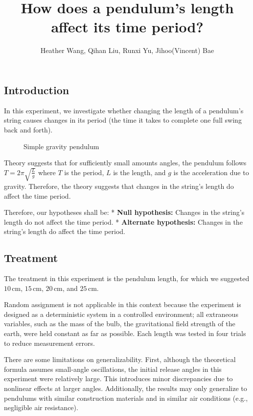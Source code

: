 \documentclass[
]{article}
\title{How does a pendulum's length affect its time period?}
\author{Heather Wang, Qihan Liu, Runxi Yu, Jihoo(Vincent) Bae}
\date{}
\begin{document}
\maketitle

\subsection{Introduction}\label{introduction}

In this experiment, we investigate whether changing the length of a
pendulum's string causes changes in its period (the time it takes to
complete one full swing back and forth).

\begin{figure}
\centering

\caption{Simple gravity pendulum}
\end{figure}

Theory suggests that for sufficiently small amounts angles, the pendulum
follows \(T = 2\pi\sqrt{\frac{L}{g}}\) where \(T\) is the period, \(L\)
is the length, and \(g\) is the acceleration due to gravity. Therefore,
the theory suggests that changes in the string's length do affect the
time period.

Therefore, our hypotheses shall be: * \textbf{Null hypothesis:} Changes
in the string's length do not affect the time period. *
\textbf{Alternate hypothesis:} Changes in the string's length do affect
the time period.

\subsection{Treatment}\label{treatment}

The treatment in this experiment is the pendulum length, for which we
suggested \(10\,\mathrm{cm}\), \(15\,\mathrm{cm}\), \(20\,\mathrm{cm}\),
and \(25\,\mathrm{cm}\).

Random assignment is not applicable in this context because the
experiment is designed as a deterministic system in a controlled
environment; all extraneous variables, such as the mass of the bulb, the
gravitational field strength of the earth, were held constant as far as
possible. Each length was tested in four trials to reduce measurement
errors.

There are some limitations on generalizability. First, although the
theoretical formula assumes small-angle oscillations, the initial
release angles in this experiment were relatively large. This introduces
minor discrepancies due to nonlinear effects at larger angles.
Additionally, the results may only generalize to pendulums with similar
construction materials and in similar air conditions (e.g., negligible
air resistance).
\end{document}
